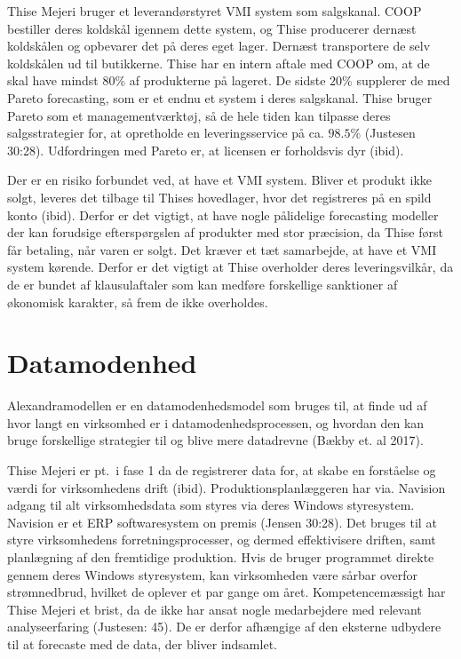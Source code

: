 \documentclass[
  12pt,
  a4paper,
  DIV=11,
  numbers=noendperiod]{scrartcl}
\begin{document}
Thise Mejeri bruger et leverandørstyret VMI system som salgskanal. COOP
bestiller deres koldskål igennem dette system, og Thise producerer
dernæst koldskålen og opbevarer det på deres eget lager. Dernæst
transportere de selv koldskålen ud til butikkerne. Thise har en intern
aftale med COOP om, at de skal have mindst \(80\%\) af produkterne på
lageret. De sidste \(20\%\) supplerer de med Pareto forecasting, som er
et endnu et system i deres salgskanal. Thise bruger Pareto som et
managementværktøj, så de hele tiden kan tilpasse deres salgsstrategier
for, at opretholde en leveringsservice på ca. \(98.5\%\) (Justesen
30:28). Udfordringen med Pareto er, at licensen er forholdsvis dyr
(ibid).

Der er en risiko forbundet ved, at have et VMI system. Bliver et produkt
ikke solgt, leveres det tilbage til Thises hovedlager, hvor det
registreres på en spild konto (ibid). Derfor er det vigtigt, at have
nogle pålidelige forecasting modeller der kan forudsige efterspørgslen
af produkter med stor præcision, da Thise først får betaling, når varen
er solgt. Det kræver et tæt samarbejde, at have et VMI system kørende.
Derfor er det vigtigt at Thise overholder deres leveringsvilkår, da de
er bundet af klausulaftaler som kan medføre forskellige sanktioner af
økonomisk karakter, så frem de ikke overholdes.

\hypertarget{datamodenhed}{%
\section{Datamodenhed}\label{datamodenhed}}

Alexandramodellen er en datamodenhedsmodel som bruges til, at finde ud
af hvor langt en virksomhed er i datamodenhedsprocessen, og hvordan den
kan bruge forskellige strategier til og blive mere datadrevne (Bækby et.
al 2017).

Thise Mejeri er pt.~i fase 1 da de registrerer data for, at skabe en
forståelse og værdi for virksomhedens drift (ibid).
Produktionsplanlæggeren har via. Navision adgang til alt virksomhedsdata
som styres via deres Windows styresystem. Navision er et ERP
softwaresystem on premis (Jensen 30:28). Det bruges til at styre
virksomhedens forretningsprocesser, og dermed effektivisere driften,
samt planlægning af den fremtidige produktion. Hvis de bruger programmet
direkte gennem deres Windows styresystem, kan virksomheden være sårbar
overfor strømnedbrud, hvilket de oplever et par gange om året.
Kompetencemæssigt har Thise Mejeri et brist, da de ikke har ansat nogle
medarbejdere med relevant analyseerfaring (Justesen: 45). De er derfor
afhængige af den eksterne udbydere til at forecaste med de data, der
bliver indsamlet.
\end{document}

